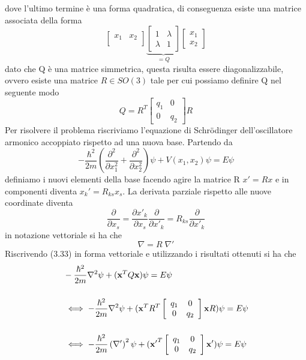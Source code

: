 dove l'ultimo termine \`e una forma quadratica, di conseguenza esiste una matrice associata della forma 
\begin{equation*}
\left [ \begin{array}{cc}
		x_1 & x_2\\ 
	\end{array} \right ]
	\underbrace{\left [ \begin{array}{cc}
		1 & \lambda \\ 
		\lambda & 1 
	\end{array} \right ]}_{=Q}
	\left [ \begin{array}{c}
		x_1 \\ 
		x_2 
	\end{array} \right ] 
\end{equation*} 
dato che Q \`e una matrice simmetrica, questa risulta essere diagonalizzabile, ovvero esiste una matrice $R \in SO(3)$ tale per cui possiamo definire Q nel seguente modo 
\begin{equation*}
	Q = R^{T} \left [ \begin{array}{cc}
		q_1 & 0 \\ 
		0 & q_2 
	\end{array} \right ]R
\end{equation*} 
Per risolvere il problema riscriviamo l'equazione di Schr\"odinger dell'oscillatore armonico accoppiato rispetto ad una nuova base. Partendo da
\begin{equation}
	-\frac{\hbar^2}{2m} \left (\frac{\partial^2}{\partial x_1^2} + \frac{\partial^2}{\partial x_2^2} \right) \psi + V(x_1,x_2)\psi = E\psi 
\end{equation} 
definiamo i nuovi elementi della base facendo agire la matrice R $x' = Rx$ e in componenti diventa $x_k' = R_{ks}x_s$. La derivata parziale rispetto alle nuove coordinate diventa 
\begin{equation*}
	\frac{\partial }{\partial x_s} = \frac{\partial x'_k}{\partial x_s}\frac{\partial}{\partial x'_k} = R_{ks} \frac{\partial}{\partial x'_k}
\end{equation*}
in notazione vettoriale si ha che 
\begin{equation*}
	\nabla = R \;\nabla'
\end{equation*}
Riscrivendo (3.33) in forma vettoriale e utilizzando i risultati ottenuti si ha che
\begin{align*}
	&- \frac{\hbar^2}{2m} \nabla^2\psi + (\bold{x}^{T}Q\bold{x}) \psi = E \psi \\[0.5cm]
	&\iff - \frac{\hbar^2}{2m} \nabla^2\psi + (\bold{x}^TR^T\left [ \begin{array}{cc}
		q_1 & 0 \\ 
		0 & q_2 
	\end{array} \right ] \bold{x}R)\psi = E \psi \\[0.5cm]
	& \iff - \frac{\hbar^2}{2m} \left( \nabla' \right)^2 \psi + (\bold{x'}^T\left [ \begin{array}{cc}
		q_1 & 0 \\ 
		0 & q_2 
	\end{array} \right ] \bold{x'})\psi = E \psi
\end{align*}
